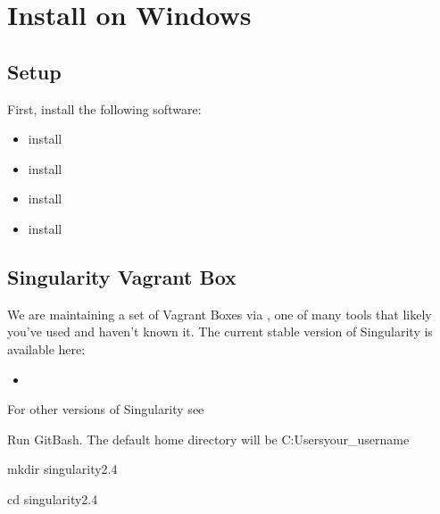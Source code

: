 \documentclass[letterpaper,10pt,english]{sphinxmanual}
\begin{document}
\section{Install on Windows}
\label{\detokenize{installation:install-on-windows}}

\subsection{Setup}
\label{\detokenize{installation:setup}}
First, install the following software:
\begin{itemize}
\item {} 
install 

\item {} 
install 

\item {} 
install 

\item {} 
install 

\end{itemize}


\subsection{Singularity Vagrant Box}
\label{\detokenize{installation:singularity-vagrant-box}}
We are maintaining a set of Vagrant Boxes via , one of  many tools that likely you’ve used and haven’t known it. The current stable version of Singularity is available here:
\begin{itemize}
\item {} 

\end{itemize}

For other versions of Singularity see 

Run GitBash. The default home directory will be C:Usersyour\_username

%
\begin{sphinxVerbatim}[commandchars=\\\{\}]
mkdir singularity\PYGZhy{}2.4

cd singularity\PYGZhy{}2.4
\end{sphinxVerbatim}
\end{document}
